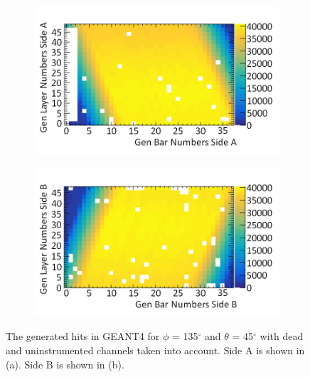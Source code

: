 \begin{figure}[!h]
\centering
\begin{subfigure}{.5\textwidth}
  \centering
  \includegraphics[width=\linewidth]{Chapter6/Figs/Raster/sideAGen_PVsT_135_45MedText.png}
  \captionsetup{width=.9\linewidth}
  \caption{}
  \label{subFig:sideAGen_PVsT_135_45}
\end{subfigure}%
\begin{subfigure}{.5\textwidth}
  \centering
\includegraphics[width=\linewidth]{Chapter6/Figs/Raster/sideBGen_PVsT_135_45MedText.png}
  \captionsetup{width=.9\linewidth}
  \caption{}
  \label{subFig:sideBGen_PVsT_135_45}
\end{subfigure}
\caption[The generated hits in GEANT4 for $\phi$ = 135$^\circ$ and $\theta$ = 45$^\circ$.]{The generated hits in GEANT4 for $\phi$ = 135$^\circ$ and $\theta$ = 45$^\circ$ with dead and uninstrumented channels taken into account. Side A is shown in (a). Side B is shown in (b).}
\label{fig:sideABGen_PVsT_135_45}
\end{figure}

